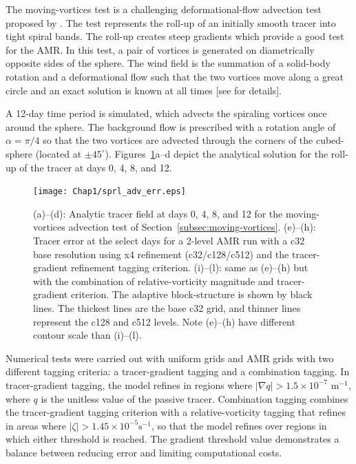 The moving-vortices test is
a challenging deformational-flow advection test proposed by
\cite{Nair:2008fk}.  The test represents the roll-up of an initially
smooth tracer into tight spiral bands. The roll-up creates steep
gradients which provide a good test for the AMR.  In this test, a pair
of vortices is generated on diametrically opposite sides of the sphere.
The wind field is the summation of a solid-body rotation and a
deformational flow such that the two vortices move along a great circle 
and an exact solution is known at all times [see \cite{Nair:2008fk} for details].

A 12-day time period is simulated,
which advects the spiraling vortices once around the sphere.  The
background flow is prescribed with a rotation angle of $\alpha=\pi/4$
so that the two vortices are advected through the corners of the
cubed-sphere (located at $\pm 45^\circ$).
Figures~\ref{fig:spradverrplots}a--d depict the analytical solution for the roll-up of the tracer at
days 0, 4, 8, and 12.
%
\begin{figure}
    \centerline{%
    \noindent
    \texttt{[image: Chap1/sprl\_adv\_err.eps]}}
    \caption{(a)--(d): Analytic tracer field at days 0, 4, 8, and 12
for the moving-vortices advection test of
Section~\ref{subsec:moving-vortices}.
    (e)--(h): Tracer error at the select days for a 2-level AMR run with a
    c32 base resolution using x4 refinement (c32/c128/c512) and the
    tracer-gradient refinement tagging criterion.  (i)--(l): same as (e)--(h)
    but with the combination of relative-vorticity magnitude and tracer-gradient
    criterion.  The adaptive block-structure is shown by black
    lines.  The thickest lines are the base c32 grid, and thinner lines
    represent the c128 and c512 levels.  Note (e)--(h) have different
    contour scale than (i)--(l).}%
    \label{fig:spradverrplots}
\end{figure}
%
Numerical tests were carried out with uniform grids and AMR grids with
two different tagging criteria:  a tracer-gradient tagging and a
combination tagging.  In tracer-gradient tagging, the model refines in
regions where $|\nabla q| > 1.5 \times 10^{-7}$ $\mathrm{m}^{-1}$,
where 
$q$ is the unitless value of the passive tracer.  Combination tagging
combines the tracer-gradient tagging criterion with a relative-vorticity
tagging that refines in areas where 
$| \zeta | > 1.45 \times 10^{-5}\mathrm { s}^{-1}$, 
so that the model refines over regions in which either
threshold is reached. 
The gradient threshold value demonstrates a balance between 
reducing error and limiting computational costs. 
